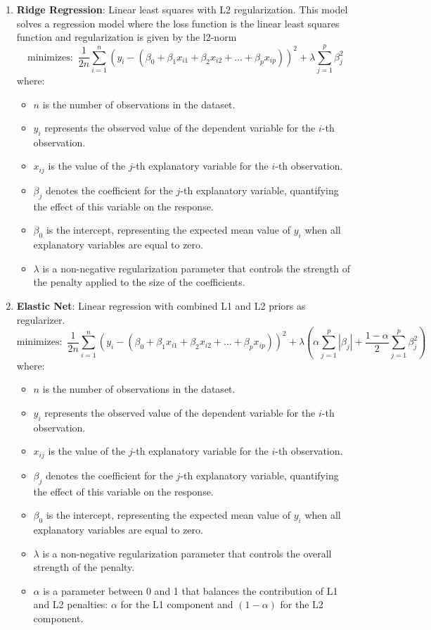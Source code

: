\documentclass{article}
\theoremstyle{mytheoremstyle}
\theoremstyle{mytheoremstyle}
\theoremstyle{myproblemstyle}
\begin{document}
\begin{enumerate}
    \item \textbf{Ridge Regression}: Linear least squares with L2 regularization. This model solves a regression model where the loss function is the linear least squares function and regularization is given by the l2-norm
       \[
        \text{minimizes: } \, \frac{1}{2n} \sum_{i=1}^n \left(y_i - (\beta_0 + \beta_1 x_{i1} + \beta_2 x_{i2} + \dots + \beta_p x_{ip})\right)^2 + \lambda \sum_{j=1}^p \beta_j^2\] 
        where:
\begin{itemize}
    \item $n$ is the number of observations in the dataset.
    \item $y_i$ represents the observed value of the dependent variable for the $i$-th observation.
    \item $x_{ij}$ is the value of the $j$-th explanatory variable for the $i$-th observation.
    \item $\beta_j$ denotes the coefficient for the $j$-th explanatory variable, quantifying the effect of this variable on the response.
    \item $\beta_0$ is the intercept, representing the expected mean value of $y_i$ when all explanatory variables are equal to zero.
    \item $\lambda$ is a non-negative regularization parameter that controls the strength of the penalty applied to the size of the coefficients.
\end{itemize}

    
    \item \textbf{Elastic Net}: Linear regression with combined L1 and L2 priors as regularizer.
    \[
        \text{minimizes: } \, \frac{1}{2n} \sum_{i=1}^n \left(y_i - (\beta_0 + \beta_1 x_{i1} + \beta_2 x_{i2} + \dots + \beta_p x_{ip})\right)^2 + \lambda \left( \alpha \sum_{j=1}^p |\beta_j| + \frac{1-\alpha}{2} \sum_{j=1}^p \beta_j^2 \right)
\]
where:
\begin{itemize}
    \item $n$ is the number of observations in the dataset.
    \item $y_i$ represents the observed value of the dependent variable for the $i$-th observation.
    \item $x_{ij}$ is the value of the $j$-th explanatory variable for the $i$-th observation.
    \item $\beta_j$ denotes the coefficient for the $j$-th explanatory variable, quantifying the effect of this variable on the response.
    \item $\beta_0$ is the intercept, representing the expected mean value of $y_i$ when all explanatory variables are equal to zero.
    \item $\lambda$ is a non-negative regularization parameter that controls the overall strength of the penalty.
    \item $\alpha$ is a parameter between 0 and 1 that balances the contribution of L1 and L2 penalties: $\alpha$ for the L1 component and $(1-\alpha)$ for the L2 component.
\end{itemize}



\end{enumerate}
\end{document}
